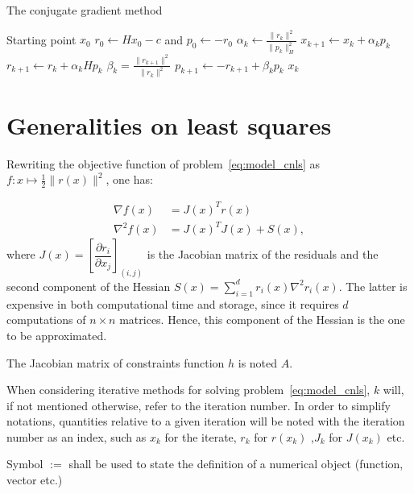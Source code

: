 \documentclass[10pt]{article}
\numberwithin{equation}{section}
\begin{document}
	\begin{algorithm}
		\caption{The conjugate gradient method}\label{algo:cg_method}
		\begin{algorithmic}
			\Require Starting point $x_0$
			\State $r_0 \gets Hx_0-c$ and $p_0 \gets -r_0$
				\State $\alpha_k \gets \frac{\|r_k\|^2}{\|p_k\|^2_H}$
				\State $x_{k+1} \gets x_k+\alpha_kp_k$
				\State $r_{k+1} \gets r_k + \alpha_kHp_k$
				\State $\beta_k =  \frac{\|r_{k+1}\|^2}{\|r_k\|^2}$
				\State $p_{k+1} \gets -r_{k+1}+\beta_kp_k$
			\EndFor{}
			\Return $x_k$
		\end{algorithmic}
	\end{algorithm} 
	
	
	
	\section{Generalities on least squares}
	 
	 Rewriting the objective function of problem~\eqref{eq:model_cnls} as $f\colon x \mapsto  \frac{1}{2} \|r(x)\|^2$, one has:
	 
	 \begin{subequations}
	 		\begin{align}
	 		\nabla f(x) &= J(x)^Tr(x)\label{subeq:ls_grad} \\
	 		\nabla^2 f(x) &= J(x)^TJ(x) + S(x) , \label{subeq:ls_hessian}
	 		\end{align}
	 \end{subequations}
	 where $J(x) = \left[\dfrac{\partial r_i}{\partial x_j}\right]_{(i,j)}$ is the Jacobian matrix of the residuals and the second component of the Hessian $S(x) = \sum_{i=1}^{d} r_i(x) \nabla^2r_i(x) $. The latter is expensive in both computational time and storage, since it requires $d$ computations of $n\times n$ matrices. Hence, this component of the Hessian is the one to be approximated. 
	 
	 The Jacobian matrix of constraints function $h$ is noted $A$.
	 
	 When considering iterative methods for solving problem~\eqref{eq:model_cnls}, $k$ will, if not mentioned otherwise, refer to the iteration number. In order to simplify notations, quantities relative to a given iteration will be noted with the iteration number as an index, such as $x_k$ for the iterate, $r_k$ for $r(x_k)$ ,$J_k$ for $J(x_k)$ etc.
	 
	 Symbol $:=$ shall be used to state the definition of a numerical object (function, vector etc.)
	 
\end{document}
